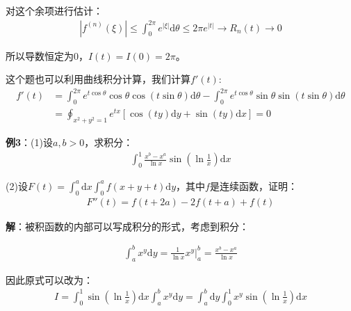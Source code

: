 \documentclass{ctexart}
\let\oldtextbf\textbf
\renewcommand{\textbf}[1]{\textcolor{brown!50!red}{\oldtextbf{#1}}}
\begin{document}
对这个余项进行估计：
\begin{align*}
    |f^{(n)}(\xi)|\leq\int_0^{2\pi}e^{|\xi|}\mathrm{d}\theta\leq 2\pi e^{|t|}\to   R_n(t)\to 0
\end{align*}

所以导数恒定为0，$I(t)=I(0)=2\pi$。
\begin{tcolorbox}[
    colback=bac1,     %
    colframe=fra1,   %
    coltitle=white!80,    
    coltext=tex1,%
    title=另一种办法,
    fonttitle=\bfseries,        %
    arc=2mm,                     %
    breakable
]
这个题也可以利用曲线积分计算，我们计算$f'(t)$:
\begin{align*}
f'(t)&=\int_0^{2\pi}e^{t\cos\theta}\cos\theta\cos(t\sin\theta)\mathrm{d}\theta
-\int_0^{2\pi}e^{t\cos\theta}\sin\theta\sin(t\sin\theta)\mathrm{d}\theta\\
&=\oint_{x^2+y^2=1}e^{tx}[\cos(ty)\mathrm{d}y+\sin(ty)\mathrm{d}x ]=0
\end{align*}
\end{tcolorbox}

\textbf{\color{brown!50!red} 例3}：(1)设$a,b>0$，求积分：
\begin{align*}
    \int_0^1 \frac{x^b-x^a}{\ln x}\sin(\ln\frac{1}{x})\mathrm{d}x
\end{align*}

(2)设$F(t)=\int_0^a \mathrm{d}x\int_0^a f(x+y+t)\mathrm{d}y$，其中$f$是连续函数，证明：
\begin{align*}
    F''(t)=f(t+2a)-2f(t+a)+f(t)
\end{align*}

\textbf{\color{brown!50!red} 解}：被积函数的内部可以写成积分的形式，考虑到积分：
\begin{tcolorbox}[
    colback=bac1,     %
    colframe=fra1,   %
    coltitle=white,             %
    coltext=tex1,
    title=常见辅助积分,
    fonttitle=\bfseries,        %
    arc=3mm,                    %
    breakable,
]
\begin{align*}
    \int_a^b x^y\mathrm{d}y=\frac{1}{\ln x}x^y|_a^b=\frac{x^b-x^a}{\ln x}
\end{align*}
\end{tcolorbox}

因此原式可以改为：
\begin{align*}
I=\int_0^1\sin(\ln\frac{1}{x})\mathrm{d}x\int_a^b{x^y}\mathrm{d}y =\int_a^b\mathrm{d}y\int_0^1x^y\sin(
\ln\frac{1}{x})\mathrm{d}x  
\end{align*}
\end{document}
